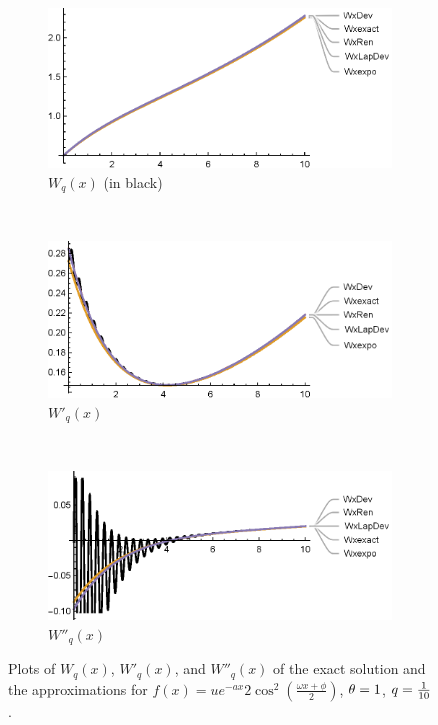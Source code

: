 \begin{figure}[!h]
    \centering
    \begin{subfigure}[b]{0.8\textwidth}
        \includegraphics[width=\textwidth]{MatExpCosW}
        \caption{$W_q(x)$  (in black)}
        \label{fig:MatExpCosW}
    \end{subfigure}
    ~
    \\
    \begin{subfigure}[b]{0.8\textwidth}
        \includegraphics[width=\textwidth]{MatExpCosW1}
        \caption{$W'_q(x)$}
        \label{fig:MatExpCosW1}
    \end{subfigure}
    ~
    \\
    \begin{subfigure}[b]{0.8\textwidth}
        \includegraphics[width=\textwidth]{MatExpCosW2}
        \caption{$W''_q(x)$}
        \label{fig:MatExpCosW2}
    \end{subfigure}
    \caption{Plots of $W_q(x)$, $W'_q(x)$, and $W''_q(x)$ of the exact solution and the approximations for $f(x)= u e^{-a x} 2 \cos ^{2}\left(\frac{\omega x+\phi}{2}\right)$, $\theta =1$, $q=\frac{1}{10}$.}\label{fig:MatExpCos}
\end{figure}


